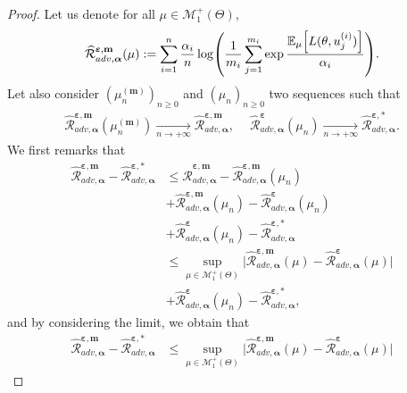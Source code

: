 \begin{proof}
Let us denote for all $\mu\in\mathcal{M}_1^{+}(\Theta)$,
\begin{align*}
  \widehat{\mathcal{R}}^{\bm{\varepsilon},\textbf{m}}_{adv,\bm{\alpha}}(\mu):=  \sum_{i=1}^\numsamples  \frac{\alpha_i}{\numsamples}\log\left( \frac{1}{m_i}\sum_{j=1}^{m_i}\exp\frac{\mathbb{E}_{ \mu}\left[\loss(\theta,u_j^{(i)})\right]}{\alpha_i}\right).
\end{align*}
Let also consider $(\mu^{(\textbf{m})}_n)_{n\geq 0}$ and $(\mu_n)_{n\geq 0}$ two sequences such that
\begin{align*}
 \widehat{\mathcal{R}}^{\bm{\varepsilon},\textbf{m}}_{adv,\bm{\alpha}}(\mu^{(\textbf{m})}_n) \xrightarrow[n \to +\infty]{}\widehat{\mathcal{R}}^{\bm{\varepsilon},\textbf{m}}_{adv,\bm{\alpha}},~\quad
\widehat{\mathcal{R}}^{\bm{\varepsilon}}_{adv,\bm{\alpha}}(\mu_n)\xrightarrow[n \to +\infty]{}\widehat{\mathcal{R}}^{\bm{\varepsilon},*}_{adv,\bm{\alpha}}.
\end{align*}
We first remarks that
\begin{align*}
\widehat{\mathcal{R}}^{\bm{\varepsilon},\textbf{m}}_{adv,\bm{\alpha}}- \widehat{\mathcal{R}}^{\bm{\varepsilon},*}_{adv,\bm{\alpha}}&\leq \widehat{\mathcal{R}}^{\bm{\varepsilon},\textbf{m}}_{adv,\bm{\alpha}} - \widehat{\mathcal{R}}^{\bm{\varepsilon},\textbf{m}}_{adv,\bm{\alpha}}(\mu_n)\\
& + \widehat{\mathcal{R}}^{\bm{\varepsilon},\textbf{m}}_{adv,\bm{\alpha}}(\mu_n) - \widehat{\mathcal{R}}^{\bm{\varepsilon}}_{adv,\bm{\alpha}}(\mu_n)\\
&+ \widehat{\mathcal{R}}^{\bm{\varepsilon}}_{adv,\bm{\alpha}}(\mu_n)-
\widehat{\mathcal{R}}^{\bm{\varepsilon},*}_{adv,\bm{\alpha}} \\
&\leq \sup_{\mu\in \mathcal{M}^+_1(\Theta)}\Big|\widehat{\mathcal{R}}^{\bm{\varepsilon},\textbf{m}}_{adv,\bm{\alpha}}(\mu) - \widehat{\mathcal{R}}^{\bm{\varepsilon}}_{adv,\bm{\alpha}}(\mu) \Big|\\
& + \widehat{\mathcal{R}}^{\bm{\varepsilon}}_{adv,\bm{\alpha}}(\mu_n)-
\widehat{\mathcal{R}}^{\bm{\varepsilon},*}_{adv,\bm{\alpha}},
\end{align*}
and by considering the limit, we obtain that
\begin{align*}
  \widehat{\mathcal{R}}^{\bm{\varepsilon},\textbf{m}}_{adv,\bm{\alpha}}- \widehat{\mathcal{R}}^{\bm{\varepsilon},*}_{adv,\bm{\alpha}}&\leq  \sup_{\mu\in \mathcal{M}^+_1(\Theta)}\Big|\widehat{\mathcal{R}}^{\bm{\varepsilon},\textbf{m}}_{adv,\bm{\alpha}}(\mu) - \widehat{\mathcal{R}}^{\bm{\varepsilon}}_{adv,\bm{\alpha}}(\mu) \Big| 

\end{align*}
\end{proof}
